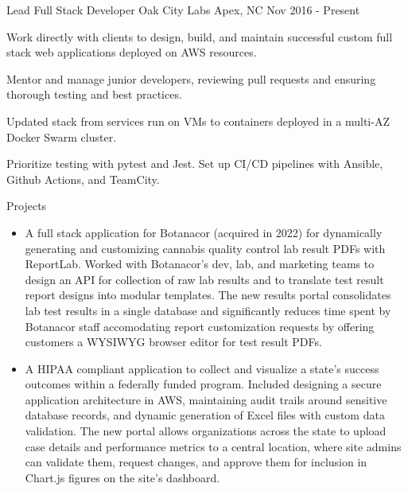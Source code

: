 

\begin{cventries}

  \cventry
    {Lead Full Stack Developer} %
    {Oak City Labs} %
    {Apex, NC} %
    {Nov 2016 - Present} %
    {
      \begin{cvitems} %
        \item {Work directly with clients to design, build, and maintain successful custom full stack web applications deployed on AWS resources.}
        \item {Mentor and manage junior developers, reviewing pull requests and ensuring thorough testing and best practices.}
        \item {Updated stack from services run on VMs to containers deployed in a multi-AZ Docker Swarm cluster.}
        \item {Prioritize testing with pytest and Jest. Set up CI/CD pipelines with Ansible, Github Actions, and TeamCity.}
        \item {Projects
          \begin{itemize}[leftmargin=2ex, nosep, noitemsep]
          \setlength{\parskip}{0pt}
            \item {A full stack application for Botanacor (acquired in 2022) for dynamically generating and customizing cannabis quality control lab result PDFs with ReportLab. Worked with Botanacor's dev, lab, and marketing teams to design an API for collection of raw lab results and to translate test result report designs into modular templates. The new results portal consolidates lab test results in a single database and significantly reduces time spent by Botanacor staff accomodating report customization requests by offering customers a WYSIWYG browser editor for test result PDFs.}
            \item {A HIPAA compliant application to collect and visualize a state's success outcomes within a federally funded program. Included designing a secure application architecture in AWS, maintaining audit trails around sensitive database records, and dynamic generation of Excel files with custom data validation. The new portal allows organizations across the state to upload case details and performance metrics to a central location, where site admins can validate them, request changes, and approve them for inclusion in Chart.js figures on the site's dashboard.}

\end{itemize}}
\end{cvitems}}
\end{cventries}
